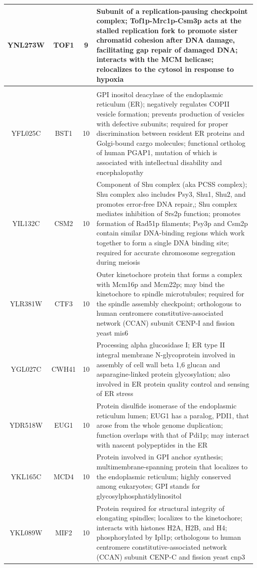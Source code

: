 \documentclass[]{article}
\begin{document}
\begin{longtable}{@{\extracolsep{3pt}} cccp{85mm}}
YNL273W & TOF1 & 9 & Subunit of a replication-pausing checkpoint complex; Tof1p-Mrc1p-Csm3p acts at the stalled replication fork to promote sister chromatid cohesion after DNA damage, facilitating gap repair of damaged DNA; interacts with the MCM helicase; relocalizes to the cytosol in response to hypoxia \\   \hline \\ [-1.8ex] 
YFL025C & BST1 & 10 & GPI inositol deacylase of the endoplasmic reticulum (ER); negatively regulates COPII vesicle formation; prevents production of vesicles with defective subunits; required for proper discrimination between resident ER proteins and Golgi-bound cargo molecules; functional ortholog of human PGAP1, mutation of which is associated with intellectual disability and encephalopathy \\ 
YIL132C & CSM2 & 10 & Component of Shu complex (aka PCSS complex); Shu complex also includes Psy3, Shu1, Shu2, and promotes error-free DNA repair,; Shu complex mediates inhibition of Srs2p function; promotes formation of Rad51p filaments; Psy3p and Csm2p contain similar DNA-binding regions which work together to form a single DNA binding site; required for accurate chromosome segregation during meiosis \\ 
YLR381W & CTF3 & 10 & Outer kinetochore protein that forms a complex with Mcm16p and Mcm22p; may bind the kinetochore to spindle microtubules; required for the spindle assembly checkpoint; orthologous to human centromere constitutive-associated network (CCAN) subunit CENP-I and fission yeast mis6 \\ 
YGL027C & CWH41 & 10 & Processing alpha glucosidase I; ER type II integral membrane N-glycoprotein involved in assembly of cell wall beta 1,6 glucan and asparagine-linked protein glycosylation; also involved in ER protein quality control and sensing of ER stress \\ 
YDR518W & EUG1 & 10 & Protein disulfide isomerase of the endoplasmic reticulum lumen; EUG1 has a paralog, PDI1, that arose from the whole genome duplication; function overlaps with that of Pdi1p; may interact with nascent polypeptides in the ER \\ 
YKL165C & MCD4 & 10 & Protein involved in GPI anchor synthesis; multimembrane-spanning protein that localizes to the endoplasmic reticulum; highly conserved among eukaryotes; GPI stands for glycosylphosphatidylinositol \\ 
YKL089W & MIF2 & 10 & Protein required for structural integrity of elongating spindles; localizes to the kinetochore; interacts with histones H2A, H2B, and H4; phosphorylated by Ipl1p; orthologous to human centromere constitutive-associated network (CCAN) subunit CENP-C and fission yeast cnp3 \\ 

\end{longtable}
\end{document}
